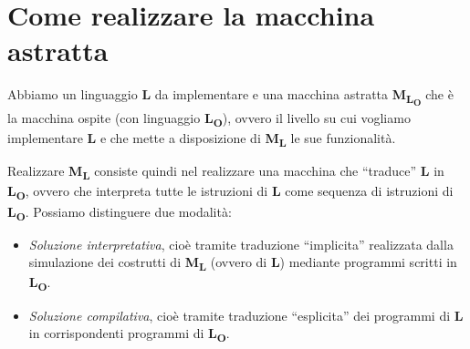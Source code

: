 \documentclass[a4paper,oneside,titlepage]{book}
\begin{document}
\section{Come realizzare la macchina astratta}
Abbiamo un linguaggio \textbf{L} da implementare e una macchina astratta \textbf{M\textsubscript{L\textsubscript{O}}} che è la macchina ospite (con linguaggio \textbf{L\textsubscript{O}}), ovvero il livello su cui vogliamo implementare \textbf{L} e che mette a disposizione di \textbf{M\textsubscript{L}} le sue funzionalità.

Realizzare \textbf{M\textsubscript{L}} consiste quindi nel realizzare una macchina che ``traduce'' \textbf{L} in \textbf{L\textsubscript{O}}, ovvero che interpreta tutte le istruzioni di \textbf{L} come sequenza di istruzioni di \textbf{L\textsubscript{O}}. Possiamo distinguere due modalità:
\begin{itemize}
	\item \textit{Soluzione interpretativa}, cioè tramite traduzione ``implicita'' realizzata dalla simulazione dei costrutti di \textbf{M\textsubscript{L}} (ovvero di \textbf{L}) mediante programmi scritti in \textbf{L\textsubscript{O}}.
	\item \textit{Soluzione compilativa}, cioè tramite traduzione ``esplicita'' dei programmi di \textbf{L} in corrispondenti programmi di \textbf{L\textsubscript{O}}.
\end{itemize}
\end{document}
